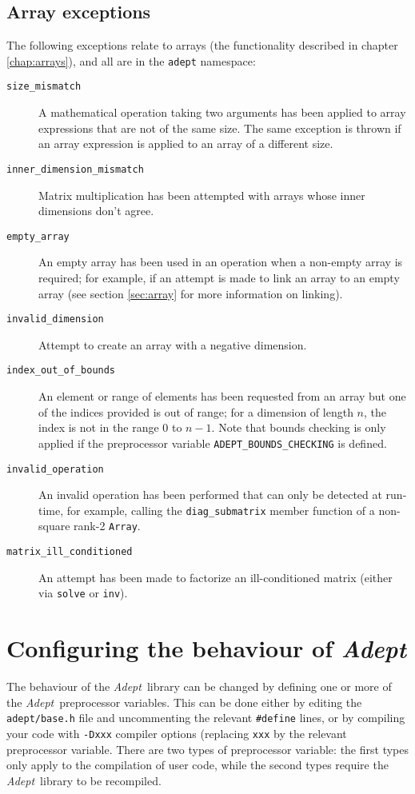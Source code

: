 \documentclass[a4,oneside]{book}
\def\codesize{\small}
\def\Adept{\emph{Adept}}
\def\code#1{{\codesize\texttt{#1}}}
\def\citem#1{\item[{\codesize\texttt{#1}}]}
\begin{document}
\subsection{Array exceptions}
\label{sec:array_exceptions}
The following exceptions relate to arrays (the functionality described
in chapter \ref{chap:arrays}), and all are in the \code{adept}
namespace:
\begin{description}
\citem{size\_mismatch} A mathematical operation taking two arguments
has been applied to array expressions that are not of the same
size. The same exception is thrown if an array expression is applied
to an array of a different size.
\citem{inner\_dimension\_mismatch} Matrix multiplication has been
attempted with arrays whose inner dimensions don't agree.
\citem{empty\_array} An empty array has been used in an operation when
a non-empty array is required; for example, if an attempt is made to
link an array to an empty array (see section \ref{sec:array} for more
information on linking).
\citem{invalid\_dimension} Attempt to create an array with a negative
dimension.
\citem{index\_out\_of\_bounds} An element or range of elements has
been requested from an array but one of the indices provided is out of
range; for a dimension of length $n$, the index is not in the range
$0$ to $n-1$. Note that bounds checking is only applied if the
preprocessor variable \code{ADEPT\_BOUNDS\_CHECKING} is defined.
\citem{invalid\_operation} An invalid operation has been performed
that can only be detected at run-time, for example, calling the
\code{diag\_submatrix} member function of a non-square rank-2
\code{Array}.
\citem{matrix\_ill\_conditioned} An attempt has been made to factorize
an ill-conditioned matrix (either via \code{solve} or \code{inv}).
\end{description}

\section{Configuring the behaviour of \Adept}
\label{sec:configuring}
The behaviour of the \Adept\ library can be changed by defining one or
more of the \Adept\ preprocessor variables. This can be done either by
editing the \code{adept/base.h} file and uncommenting the relevant
\code{\#define} lines, or by compiling your code with \code{-Dxxx}
compiler options (replacing \code{xxx} by the relevant preprocessor
variable. There are two types of preprocessor variable: the first
types only apply to the compilation of user code, while the second
types require the \Adept\ library to be recompiled.
\end{document}
